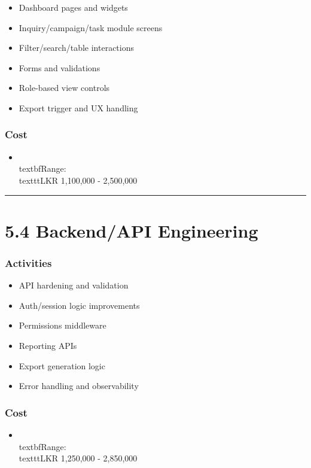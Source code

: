 \documentclass[11pt,a4paper]{article}
\begin{document}
\begin{itemize}
\item Dashboard pages and widgets
\item Inquiry/campaign/task module screens
\item Filter/search/table interactions
\item Forms and validations
\item Role-based view controls
\item Export trigger and UX handling
\end{itemize}

\subsubsection{Cost}

\begin{itemize}
\item \\textbf{Range:} \\texttt{LKR 1,100,000 - 2,500,000}
\end{itemize}

\bigskip\hrule\bigskip

\section{5.4 Backend/API Engineering}

\subsubsection{Activities}

\begin{itemize}
\item API hardening and validation
\item Auth/session logic improvements
\item Permissions middleware
\item Reporting APIs
\item Export generation logic
\item Error handling and observability
\end{itemize}

\subsubsection{Cost}

\begin{itemize}
\item \\textbf{Range:} \\texttt{LKR 1,250,000 - 2,850,000}
\end{itemize}
\end{document}
